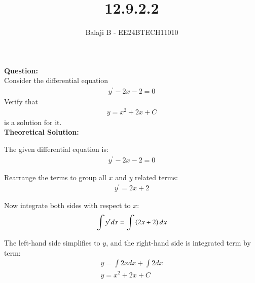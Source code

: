 \documentclass[journal]{IEEEtran}
\begin{document}

\vspace{3cm}

\title{12.9.2.2}
\author{Balaji B - EE24BTECH11010}
{\let\newpage\relax\maketitle}

\renewcommand{\thefigure}{\theenumi}
\renewcommand{\thetable}{\theenumi}
\setlength{\intextsep}{10pt} %


\renewcommand{\thetable}{\theenumi}

\textbf{Question:}\\
Consider the differential equation 
\begin{align}
    y^\prime - 2x - 2 = 0
\end{align}
Verify that
\begin{align}
    y = x^2 + 2x + C
\end{align}
is a solution for it.\\
\textbf{Theoretical Solution:}

The given differential equation is:
\begin{align}
    y^\prime - 2x - 2 = 0
\end{align}

Rearrange the terms to group all  $x$ and $y$ related terms:
\begin{align}
    y^\prime = 2x + 2
\end{align}

Now integrate both sides with respect to $x$:
\begin{align}
    \int y^\prime dx = \int \left(2x + 2\right) dx
\end{align}

The left-hand side simplifies to  $y$, and the right-hand side is integrated term by term:
\begin{align}
    y = \int 2x dx + \int 2 dx \\
    y = x^2 + 2x + C
\end{align}
\end{document}
